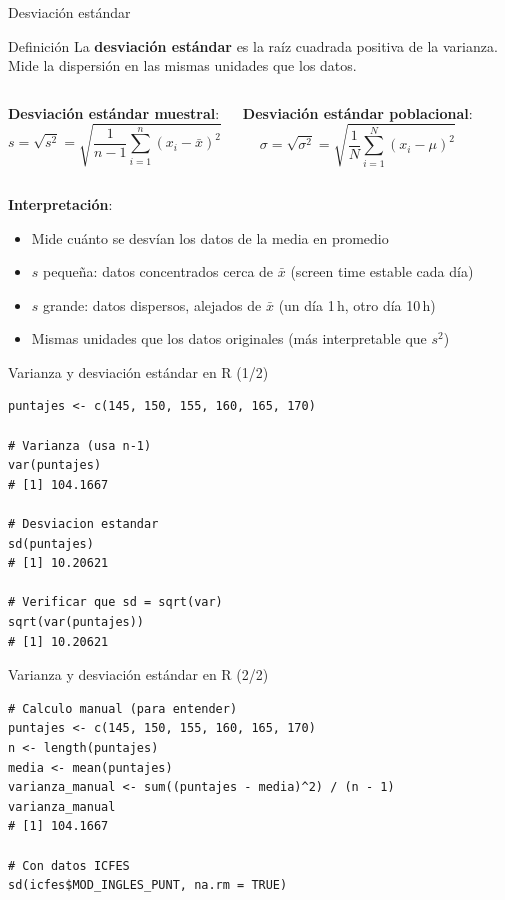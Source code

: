 \documentclass[aspectratio=169, 11pt]{beamer}
\begin{document}
\begin{frame}{Desviación estándar}
\begin{block}{Definición}
La \textbf{desviación estándar} es la raíz cuadrada positiva de la varianza. Mide la dispersión en las mismas unidades que los datos.
\end{block}

\begin{columns}[T]
\textbf{Desviación estándar muestral}:
\[
s = \sqrt{s^2} = \sqrt{\frac{1}{n-1} \sum_{i=1}^n (x_i - \bar{x})^2}
\]

\textbf{Desviación estándar poblacional}:
\[
\sigma = \sqrt{\sigma^2} = \sqrt{\frac{1}{N} \sum_{i=1}^N (x_i - \mu)^2}
\]
\end{columns}

\vspace{1em}
\textbf{Interpretación}:
\begin{itemize}
\item Mide cu\'anto se desv\'ian los datos de la media \alert{en promedio}
\item $s$ peque\~na: datos concentrados cerca de $\bar{x}$ (screen time estable cada d\'ia)
\item $s$ grande: datos dispersos, alejados de $\bar{x}$ (un d\'ia 1\,h, otro d\'ia 10\,h)
\item Mismas unidades que los datos originales (m\'as interpretable que $s^2$)
\end{itemize}
\end{frame}

\begin{frame}[fragile]{Varianza y desviación estándar en R (1/2)}
\begin{lstlisting}
puntajes <- c(145, 150, 155, 160, 165, 170)

# Varianza (usa n-1)
var(puntajes)
# [1] 104.1667

# Desviacion estandar
sd(puntajes)
# [1] 10.20621

# Verificar que sd = sqrt(var)
sqrt(var(puntajes))
# [1] 10.20621
\end{lstlisting}
\end{frame}

\begin{frame}[fragile]{Varianza y desviación estándar en R (2/2)}
\begin{lstlisting}
# Calculo manual (para entender)
puntajes <- c(145, 150, 155, 160, 165, 170)
n <- length(puntajes)
media <- mean(puntajes)
varianza_manual <- sum((puntajes - media)^2) / (n - 1)
varianza_manual
# [1] 104.1667

# Con datos ICFES
sd(icfes$MOD_INGLES_PUNT, na.rm = TRUE)
\end{lstlisting}
\end{frame}
\end{document}

